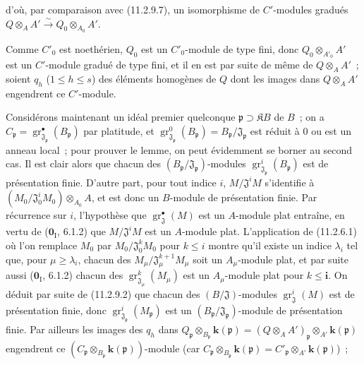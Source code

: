 d'où, par comparaison avec (11.2.9.7), un isomorphisme de $C'$-modules
gradués
$Q\otimes_AA'\xrightarrow{\sim}Q_0\otimes_{A_0}A'$.

Comme $C'_0$ est noethérien, $Q_0$ est un $C'_0$-module de type fini, donc
$Q_0\otimes_{A'_0}A'$ est un $C'$-module gradué de type fini, et il en est par
suite de même de $Q\otimes_AA'$~; soient $q_h$ ($1\leq h\leq s$) des éléments
homogènes de $Q$ dont les images dans $Q\otimes_AA'$ engendrent ce
$C'$-module.

Considérons maintenant un idéal premier quelconque
$\mathfrak p\supset\mathfrak KB$ de $B$~; on a
$C_\mathfrak p=\operatorname{gr}_{\mathfrak J_\mathfrak p}^\bullet(B_\mathfrak p)$
par platitude, et
$\operatorname{gr}_{\mathfrak J_\mathfrak p}^0(B_\mathfrak p)
=B_\mathfrak p/\mathfrak J_\mathfrak p$ est réduit à 0 ou est un anneau
local~; pour prouver le lemme, on peut évidemment se borner au second cas. Il
est clair alors que chacun des $(B_\mathfrak p/\mathfrak J_\mathfrak p)$-modules
$\operatorname{gr}_{\mathfrak J_\mathfrak p}^i(B_\mathfrak p)$ est de
présentation finie. D'autre part, pour tout indice $i$,
$M/\mathfrak J^iM$ s'identifie à
$(M_0/\mathfrak J_0^iM_0)\otimes_{A_0}A$, et est donc un $B$-module de
présentation finie. Par récurrence sur $i$, l'hypothèse que
$\operatorname{gr}_{\mathfrak J}^\bullet(M)$ est un $A$-module plat entraîne, en
vertu de ($\mathbf 0_{\mathrm I}$, 6.1.2) que $M/\mathfrak J^iM$ est un
$A$-module plat. L'application de (11.2.6.1) où l'on remplace $M_0$ par
$M_0/\mathfrak J_0^kM_0$ pour $k\leq i$ montre qu'il existe un indice
$\lambda_i$ tel que, pour $\mu\geq\lambda_i$, chacun des
$M_\mu/\mathfrak J_\mu^{k+1}M_\mu$ soit un $A_\mu$-module plat, et par suite
aussi ($\mathbf 0_{\mathrm I}$, 6.1.2) chacun des
$\operatorname{gr}_{\mathfrak J_\mu}^k(M_\mu)$ est un $A_\mu$-module plat
pour $k\leq\boldsymbol{i}$. On déduit par suite de (11.2.9.2) que chacun des
$(B/\mathfrak J)$-modules $\operatorname{gr}_{\mathfrak J}^i(M)$ est de
présentation finie, donc
$\operatorname{gr}_{\mathfrak J_\mathfrak p}^i(M_\mathfrak p)$ est un
$(B_\mathfrak p/\mathfrak J_\mathfrak p)$-module de présentation finie. Par
ailleurs les images des $q_h$ dans
$Q_\mathfrak p\otimes_{B_\mathfrak p}\boldsymbol{k}(\mathfrak p)
=(Q\otimes_AA')_\mathfrak p\otimes_{A'}\boldsymbol{k}(\mathfrak p)$
engendrent ce
$(C_\mathfrak p\otimes_{B_\mathfrak p}\boldsymbol{k}(\mathfrak p))$-module
(car $C_\mathfrak p\otimes_{B_\mathfrak p}\boldsymbol{k}(\mathfrak p)
=C'_\mathfrak p\otimes_{A'}\boldsymbol{k}(\mathfrak p)$)~;
